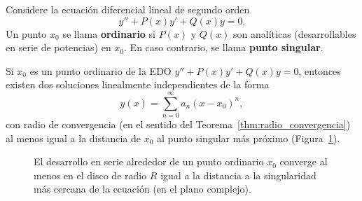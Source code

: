 \begin{definition}
  Considere la ecuación diferencial lineal de segundo orden
  \begin{equation}
    y'' + P(x)y' + Q(x)y = 0.
  \end{equation}
  Un punto $x_0$ se llama \textbf{ordinario} si $P(x)$ y $Q(x)$ son analíticas (desarrollables en serie de potencias) en $x_0$. En caso contrario, se llama \textbf{punto singular}.
\end{definition}

\begin{theorem}
\label{thm:cap30:existencia-serie}
  Si $x_0$ es un punto ordinario de la EDO $y''+P(x)y'+Q(x)y=0$, entonces existen dos soluciones linealmente independientes de la forma
  \[
    y(x)=\sum_{n=0}^{\infty} a_n (x-x_0)^n,
  \]
  con radio de convergencia (en el sentido del Teorema~\ref{thm:radio_convergencia}) al menos igual a la distancia de $x_0$ al punto singular más próximo (Figura~\ref{fig:radio_singularidades}).
\end{theorem}

\begin{figure}[!htbp]
\centering
{}
\caption{El desarrollo en serie alrededor de un punto ordinario $x_0$ converge al menos en el disco de radio $R$ igual a la distancia a la singularidad más cercana de la ecuación (en el plano complejo).}
\label{fig:radio_singularidades}
\end{figure}

